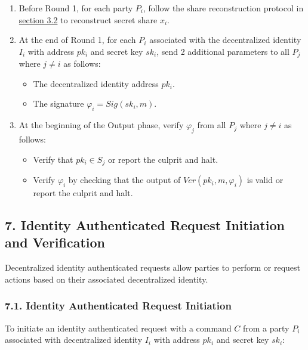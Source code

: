 \documentclass[
]{article}
\providecommand{\tightlist}{%
  \setlength{\itemsep}{0pt}\setlength{\parskip}{0pt}}
\begin{document}
\begin{enumerate}
\def\labelenumi{\arabic{enumi}.}
\tightlist
\item
  Before Round 1, for each party \(P_i\), follow the share
  reconstruction protocol in
  \protect\hyperlink{share-reconstruction}{section 3.2} to reconstruct
  secret share \(x_i\).
\item
  At the end of Round 1, for each \(P_i\) associated with the
  decentralized identity \(I_i\) with address \(pk_i\) and secret key
  \(sk_i\), send 2 additional parameters to all \(P_j\) where
  \(j \neq i\) as follows:

  \begin{itemize}
  \tightlist
  \item
    The decentralized identity address \(pk_i\).
  \item
    The signature \(\varphi _i = Sig(sk_i, m)\).
  \end{itemize}
\item
  At the beginning of the Output phase, verify \(\varphi _j\) from all
  \(P_j\) where \(j \neq i\) as follows:

  \begin{itemize}
  \tightlist
  \item
    Verify that \(pk_i \in S_j\) or report the culprit and halt.
  \item
    Verify \(\varphi _i\) by checking that the output of
    \(Ver(pk_i, m, \varphi _i)\) is valid or report the culprit and
    halt.
  \end{itemize}
\end{enumerate}

\hypertarget{decentralized-identity-request}{%
\subsection{7. Identity Authenticated Request Initiation and
Verification}\label{decentralized-identity-request}}

Decentralized identity authenticated requests allow parties to perform
or request actions based on their associated decentralized identity.

\hypertarget{identity-authed-request-initiation}{%
\subsubsection{7.1. Identity Authenticated Request
Initiation}\label{identity-authed-request-initiation}}

To initiate an identity authenticated request with a command \(C\) from
a party \(P_i\) associated with decentralized identity \(I_i\) with
address \(pk_i\) and secret key \(sk_i\):
\end{document}
